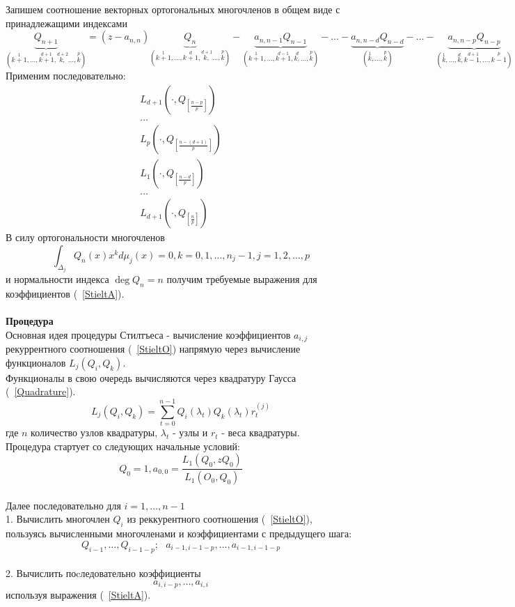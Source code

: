 Запишем соотношение векторных ортогональных многочленов в общем виде с принадлежащими индексами 
$$\underbrace{Q_{n+1}}_{(\stackrel{1}{k+1},\ldots,\stackrel{d+1}{k+1},\stackrel{d+2}{k,}\ldots,\stackrel{p}{k})}=
(z - a_{n,n})\underbrace{Q_n}_{(\stackrel{1}{k+1},\ldots,\stackrel{d}{k+1},\stackrel{d+1}{k,}\ldots,\stackrel{p}{k})} - 
\underbrace{a_{n,n-1}Q_{n-1}}_{(\stackrel{1}{k+1},\ldots,\stackrel{d-1}{k+1},\stackrel{d}{k,}\ldots,\stackrel{p}{k})}-\ldots-
\underbrace{a_{n,n-d}Q_{n-d}}_{(\stackrel{1}{k},\ldots,\stackrel{p}{k})}-\ldots-
\underbrace{a_{n,n-p}Q_{n-p}}_{(\stackrel{1}{k},\ldots,\stackrel{d}{k},\stackrel{d+1}{k-1,}\ldots,\stackrel{p}{k-1})}$$ 
Применим последовательно:
\begin{equation}
\begin{array} {cccccccccccccc}
L_{d+1} (\cdot, Q_{\left[\frac{n-p}{p}\right]}) \\
\ldots \\
L_p(\cdot, Q_{\left[\frac{n-(d+1)}{p}\right]}) \\
L_1(\cdot, Q_{\left[\frac{n-d}{p}\right]}) \\
\ldots \\
L_{d+1} (\cdot, Q_{\left[\frac{n}{p}\right]})
\end{array}
\end{equation}
В силу ортогональности многочленов 
\begin{equation}
\label{OrthogonalCondition}
\int_{\Delta_j}{Q_n(x)x^kd\mu_j(x)}=0,\mbox{
}k=0,1,\ldots,n_j-1,j=1,2,\ldots,p
\end{equation}
и нормальности индекса $\deg  Q_n=n$ получим требуемые выражения для коэффициентов (~\ref{StieltA}). \\ \\
\textbf {Процедура} \\
Основная идея процедуры Стилтъеса - вычисление коэффициентов $a_{i,j}$ рекуррентного соотношения (~\ref{StieltO}) напрямую через вычисление функционалов $L_j(Q_i,Q_k)$. \\
Функционалы в свою очередь вычисляются через квадратуру Гаусса (~\ref{Quadrature}).
\begin{equation}
L_j(Q_i,Q_k)=\sum\limits_{t=0}^{n-1}{Q_i(\lambda_{t})Q_k(\lambda_{t})r_{t}^{(j)}}
\end{equation}
где $n$ количество узлов квадратуры, $\lambda_t$ - узлы и $r_{t}$
- веса квадратуры.\\
Процедура стартует со следующих начальные условий:
$$Q_0=1, a_{0,0}=\frac{\displaystyle{L_1(Q_0,zQ_0)}}{\displaystyle{L_1(O_0,Q_0)}}$$ \\
Далее последовательно для $i=1,\ldots,n-1$ \\
1. Вычислить многочлен $Q_i$ из реккурентного соотношения (~\ref{StieltO}), пользуясь вычисленными многочленами и коэффициентами с предыдущего шага: 
$$Q_{i-1}, \ldots, Q_{i-1-p}; \mbox{    } a_{i-1,i-1-p}, \ldots,a_{i-1, i-1-p}$$  \\ 
2. Вычислить поcледовательно коэффициенты 
$$a_{i,i-p}, \ldots, a_{i,i}$$ используя выражения (~\ref{StieltA}).

